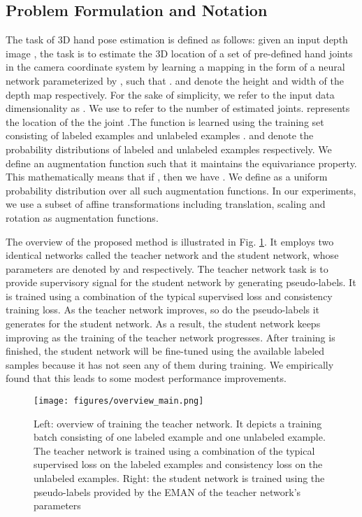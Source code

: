 \documentclass{article}
\begin{document}
\subsection{Problem Formulation and Notation}
The task of 3D hand pose estimation is defined as follows: given an input depth image , the task is to estimate the 3D location of a set of pre-defined hand joints  in the camera coordinate system by learning a mapping  in the form of a neural network parameterized by , such that .  and  denote the height and width of the depth map respectively. For the sake of simplicity, we refer to the input data dimensionality as . We use  to refer to the number of estimated joints.  represents the location of the the  joint .The function  is learned using the training set consisting of labeled examples   and unlabeled examples .  and  denote the probability distributions of labeled and unlabeled examples respectively. We define an augmentation function  such that it maintains the equivariance property. This mathematically means that if , then we have . We define  as a uniform probability distribution over all such augmentation functions. In our experiments, we use a subset of affine transformations including translation, scaling and rotation as augmentation functions. 
\par
The overview of the proposed method is illustrated in Fig. \ref{fig:overview}. It employs two identical networks called the teacher network and the student network, whose parameters are denoted by  and  respectively. The teacher network task is to provide supervisory signal for the student network by generating pseudo-labels. It is trained using a combination of the typical supervised loss and consistency training loss. As the teacher network improves, so do the pseudo-labels it generates for the student network. As a result, the student network keeps improving as the training of the teacher network progresses. After training is finished, the student network will be fine-tuned using the available labeled samples because it has not seen any of them during training. We empirically found that this leads to some modest performance improvements.


\begin{figure}[t]
\centering
\texttt{[image: figures/overview\_main.png]}
\caption{Left: overview of training the teacher network. It depicts a training batch consisting of one labeled example and one unlabeled example. The teacher network is trained using a combination of the typical supervised loss on the labeled examples and consistency loss on the unlabeled examples. Right: the student network is trained using the pseudo-labels provided by the EMAN of the teacher network's parameters}
\label{fig:overview}
\end{figure}
\end{document}
